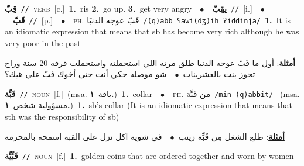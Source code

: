 \documentclass[10pt,a4paper,twoside]{article} %
\begin{document}
\begin{multicols}{2}
{{\setlength\topsep{0pt}\textbf{\foreignlanguage{arabic}{قِبّ}}\ {\color{gray}\texttt{//}\color{black}}\ \textsc{verb}\ [c.]\ \textbf{1.}~ris  \textbf{2.}~go up.  \textbf{3.}~get very angry\ \ $\bullet$\ \ \setlength\topsep{0pt}\textbf{\foreignlanguage{arabic}{يقِبّ}}\ {\color{gray}\texttt{//}\color{black}}\ [i.]\ \ $\bullet$\ \ \setlength\topsep{0pt}\textbf{\foreignlanguage{arabic}{قَبّ}}\ {\color{gray}\texttt{//}\color{black}}\ [p.]\ \ $\bullet$\ \ \textsc{ph.} \color{gray} \foreignlanguage{arabic}{قَبّ عوجه الدنيَا}\color{black}\ {\color{gray}\texttt{/{\sffamily (q)abb ʕawi(dʒ)ih ʔiddinja}/}\color{black}}\ \textbf{1.}~It is an idiomatic expression that means that sb has become very rich although he was very poor in the past\  \begin{flushright}\color{gray}\foreignlanguage{arabic}{\textbf{\underline{\foreignlanguage{arabic}{أمثلة}}}: أول ما قَبّ عوجه الدنيا طلق مرته اللي استحملته واستحملت قرفه 20 سنة وراح تجوز بنت بالعشرينات\ $\bullet$\ \  شو موصله حكي أنت حتى أخوك قَبّ علي هيك؟}\end{flushright}\color{black}} \vspace{2mm}

{\setlength\topsep{0pt}\textbf{\foreignlanguage{arabic}{قَبِّة}}\ {\color{gray}\texttt{//}\color{black}}\ \textsc{noun}\ [f.]\ \color{gray}(msa. \foreignlanguage{arabic}{ياقة}~\foreignlanguage{arabic}{\textbf{١.}})\color{black}\ \textbf{1.}~collar\ \ $\bullet$\ \ \textsc{ph.} \color{gray} \foreignlanguage{arabic}{من قَبِّة}\color{black}\ {\color{gray}\texttt{/{\sffamily min (q)abbit}/}\color{black}}\ \color{gray} (msa. \foreignlanguage{arabic}{مسؤولية شخص}~\foreignlanguage{arabic}{\textbf{١.}})\color{black}\ \textbf{1.}~sb's collar (It is an idiomatic expression that means that sth was the responsibility of sb)\  \begin{flushright}\color{gray}\foreignlanguage{arabic}{\textbf{\underline{\foreignlanguage{arabic}{أمثلة}}}: طلع الشغل مِن قَبِّة زينب\ $\bullet$\ \  في شوية اكل نزل على القبة اسمحه بالمحرمة}\end{flushright}\color{black}} \vspace{2mm}

{\setlength\topsep{0pt}\textbf{\foreignlanguage{arabic}{قَبِّيِّة}}\ {\color{gray}\texttt{//}\color{black}}\ \textsc{noun}\ [f.]\ \textbf{1.}~golden coins that are ordered together and worn by women\ 

}}
\end{multicols}
\end{document}
